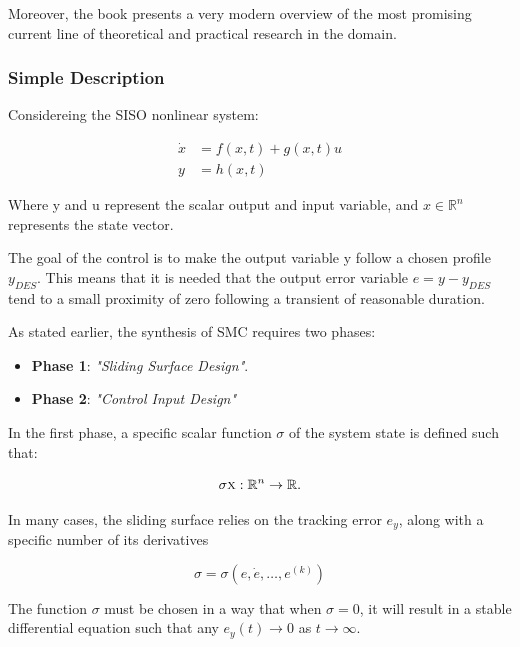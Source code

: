 \documentclass{thesisreport}
\begin{document}
Moreover, the book \cite{Bartolini2008} presents a very modern overview of the most promising current line of theoretical and practical research in the domain.

 
 \subsubsection{Simple Description}
 
 Considereing the SISO nonlinear system:
 
 \begin{align}
 \dot{x} &=f(x,t)+g(x,t)u \label{SISO_1}\\
 y &= h(x,t) \label{SISO_2}
 \end{align}


Where y and u represent the scalar output and input variable, and $x \in \mathbb{R}^n$ represents the state vector.



The goal of the control is to make the output variable y follow a chosen profile $y_{DES}$. This means that it is needed that the
output error variable $e=y-y_{DES}$ tend to a small proximity of zero following a transient of reasonable duration.


As stated earlier, the synthesis of SMC requires two phases:

\begin{itemize}
	\item [] \textbf{Phase 1}: \textit{"Sliding Surface Design"}.
	\item [] \textbf{Phase 2}: \textit{"Control Input Design"}
\end{itemize}


In the first phase, a specific scalar function $\sigma$ of the system state is defined such that:

\begin{equation*}
	\sigma{\textsc{x}}:\mathbb{R}^n \rightarrow \mathbb{R}.
\end{equation*}


In many cases, the sliding surface relies on the tracking error $e_y$, along with a specific number of its derivatives

\begin{equation}
	\sigma = \sigma(e,\dot{e},\ldots,e^{(k)})
\end{equation}


The function $\sigma$ must be chosen in a way that when $\sigma=0$, it will result in a stable differential equation such that any $e_y(t) \rightarrow 0$ as $t \rightarrow \infty$.
\end{document}
